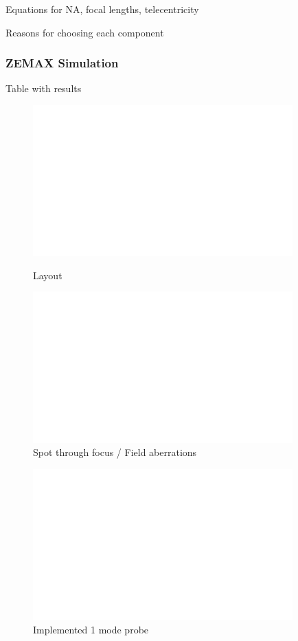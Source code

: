 Equations for NA, focal lengths, telecentricity

Reasons for choosing each component

\subsubsection{ZEMAX Simulation}

Table with results

\begin{figure}[h!]\centering \includegraphics[width=10cm,draft]{figures/foo.png}
      \caption{Layout}

 \includegraphics[width=10cm,draft]{figures/foo.png}
      \caption{Spot through focus / Field aberrations}
\end{figure}

\begin{figure}[h!]\centering \includegraphics[width=10cm,draft]{figures/foo.png}
      \caption{Implemented 1 mode probe}
\end{figure}


